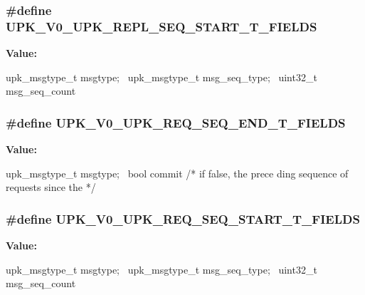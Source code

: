 \subsubsection[{UPK\_\-V0\_\-UPK\_\-REPL\_\-SEQ\_\-START\_\-T\_\-FIELDS}]{\setlength{\rightskip}{0pt plus 5cm}\#define UPK\_\-V0\_\-UPK\_\-REPL\_\-SEQ\_\-START\_\-T\_\-FIELDS}\label{upk__v0__protocol__structs_8h_aaf84780293d35388fa934a52caede103}
{\bfseries Value:}
\begin{DoxyCode}
upk_msgtype_t      msgtype; \
    upk_msgtype_t      msg_seq_type; \
    uint32_t                msg_seq_count
\end{DoxyCode}
\subsubsection[{UPK\_\-V0\_\-UPK\_\-REQ\_\-SEQ\_\-END\_\-T\_\-FIELDS}]{\setlength{\rightskip}{0pt plus 5cm}\#define UPK\_\-V0\_\-UPK\_\-REQ\_\-SEQ\_\-END\_\-T\_\-FIELDS}\label{upk__v0__protocol__structs_8h_a8e291343050a458d205a0f05b0169eb0}
{\bfseries Value:}
\begin{DoxyCode}
upk_msgtype_t       msgtype; \
    bool                    commit                         /* if false, the prece
      ding sequence of requests since the */ \
\end{DoxyCode}
\subsubsection[{UPK\_\-V0\_\-UPK\_\-REQ\_\-SEQ\_\-START\_\-T\_\-FIELDS}]{\setlength{\rightskip}{0pt plus 5cm}\#define UPK\_\-V0\_\-UPK\_\-REQ\_\-SEQ\_\-START\_\-T\_\-FIELDS}\label{upk__v0__protocol__structs_8h_a14cd585fa9163e91801363c2288cef5b}
{\bfseries Value:}
\begin{DoxyCode}
upk_msgtype_t       msgtype; \
    upk_msgtype_t       msg_seq_type; \
    uint32_t                msg_seq_count
\end{DoxyCode}
